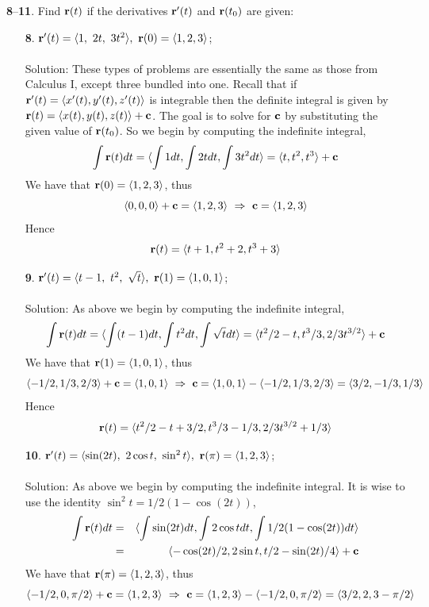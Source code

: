 \documentclass[12pt]{amsbook}
\newcommand{\la}{\langle}
\newcommand{\ra}{\rangle}
\begin{document}
\noindent
{\small {\bf 8}--{\bf 11}}. Find ${\bf r}(t)$ if the derivatives ${\bf r}'(t)$ and ${\bf r}(t_0)$ are given:
\begin{enumerate}
  \item[{\small\bf 8}.] ${\bf r}'(t)=\la 1,\ 2t,\ 3t^2 \ra, \ {\bf r}(0)=\la 1,2,3 \ra$;
  \\
  \\
  {\sc Solution}: These types of problems are essentially the same as those from Calculus I, except three bundled into one. Recall that if ${\bf r}'(t)=\la x'(t),y'(t),z'(t) \ra$ is integrable then the definite integral is given by ${\bf r}(t)=\la x(t),y(t),z(t)\ra +{\bf c}$. The goal is to solve for ${\bf c}$ by substituting the given value of ${\bf r}(t_0)$. So we begin by computing the indefinite integral,
  $$\int {\bf r}(t)dt=\la \int 1 dt, \int 2tdt, \int 3t^2 dt\ra = \la t,t^2,t^3 \ra +{\bf c}$$
  We have that ${\bf r}(0)=\la 1,2,3 \ra$, thus
  $$\la 0,0,0 \ra + {\bf c}= \la 1,2,3 \ra \ \Rightarrow \ {\bf c}=\la 1,2,3 \ra$$
  Hence
  $${\bf r}(t)=\la t+1,t^2+2,t^3+3 \ra$$
  \item[{\small\bf 9}.] ${\bf r}'(t)=\la t-1,\ t^2,\  \sqrt{t}\ra, \ {\bf r}(1)=\la 1,0,1 \ra$;
  \\
  \\
  {\sc Solution}: As above we begin by computing the indefinite integral,
  $$\int {\bf r}(t)dt=\la \int (t-1) dt, \int t^2dt, \int \sqrt{t} dt\ra = \la t^2/2-t,t^3/3,2/3t^{3/2} \ra +{\bf c}$$
  We have that ${\bf r}(1)=\la 1,0,1 \ra$, thus
  $$\la -1/2,1/3,2/3 \ra + {\bf c}= \la 1,0,1 \ra \ \Rightarrow \ {\bf c}=\la 1,0,1 \ra - \la -1/2,1/3,2/3 \ra = \la 3/2, -1/3, 1/3 \ra$$
   Hence
  $${\bf r}(t)=\la t^2/2-t+3/2,t^3/3-1/3,2/3t^{3/2}+1/3 \ra$$
  \item[{\small\bf 10}.] ${\bf r}'(t)=\la \sin(2t),\ 2\cos t,\ \sin^2 t \ra, \ {\bf r}(\pi)=\la 1,2,3 \ra$;
  \\
  \\
  {\sc Solution}: As above we begin by computing the indefinite integral. It is wise to use the identity $\sin^2 t=1/2(1-\cos(2t))$,
  \begin{eqnarray*}
\int {\bf r}(t)dt&=&\la \int \sin(2t) dt, \int 2\cos tdt, \int 1/2(1-\cos(2t)) dt\ra \\
&=& \la -\cos(2t)/2,2\sin t,t/2-\sin(2t)/4 \ra +{\bf c}  
  \end{eqnarray*}
  We have that ${\bf r}(\pi)=\la 1,2,3 \ra$, thus
  $$\la -1/2,0,\pi/2 \ra + {\bf c}= \la 1,2,3 \ra \ \Rightarrow \ {\bf c}=\la 1,2,3 \ra - \la -1/2,0,\pi/2 \ra = \la 3/2,2,3-\pi/2 \ra$$

\end{enumerate}
\end{document}

